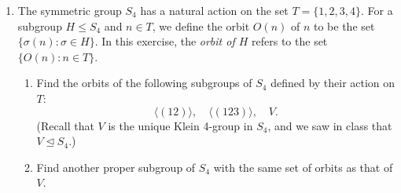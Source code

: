 \documentclass[12pt]{article}
\begin{document}
\begin{enumerate}
    \bigskip

    \item The symmetric group \( S_4 \) has a natural action on the set \( T = \{1, 2, 3, 4\} \). For a subgroup \( H \le S_4 \) and \( n \in T \), we define the orbit \( O(n) \) of \( n \) to be the set \( \{ \sigma(n) : \sigma \in H \} \). In this exercise, the \emph{orbit of \( H \)} refers to the set \( \{ O(n) : n \in T \} \).

    \begin{enumerate}[label=(\alph*)]
        \item Find the orbits of the following subgroups of \( S_4 \) defined by their action on \( T \):
        \[
            \langle (12) \rangle, \quad \langle (123) \rangle, \quad V.
        \]
        (Recall that \( V \) is the unique Klein 4-group in \( S_4 \), and we saw in class that \( V \trianglelefteq S_4 \).)

        \item Find another proper subgroup of \( S_4 \) with the same set of orbits as that of \( V \).


\end{enumerate}
\end{enumerate}
\end{document}
